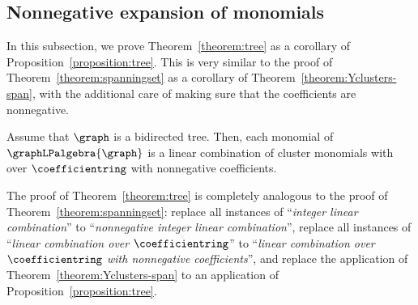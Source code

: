 \subsection{Nonnegative expansion of monomials}

In this subsection,
we prove Theorem~\ref{theorem:tree} as a corollary of Proposition~\ref{proposition:tree}.
This is very similar to the proof of Theorem~\ref{theorem:spanningset} as a corollary of Theorem~\ref{theorem:Yclusters-span},
with the additional care of making sure that the coefficients are nonnegative.

\begin{theo*}
    Assume that \(\graph\) is a bidirected tree.
    Then, each monomial of \(\graphLPalgebra{\graph}\) is a linear combination of cluster monomials with over \(\coefficientring\) with nonnegative coefficients.
\end{theo*}

The proof of Theorem~\ref{theorem:tree} is completely analogous to the proof of Theorem~\ref{theorem:spanningset}:
replace all instances of ``\emph{integer linear combination}'' to ``\emph{nonnegative integer linear combination}'',
replace all instances of ``\emph{linear combination over \(\coefficientring\)}'' to ``\emph{linear combination over \(\coefficientring\) with nonnegative coefficients}'',
and replace the application of Theorem~\ref{theorem:Yclusters-span}
to an application of Proposition~\ref{proposition:tree}.

